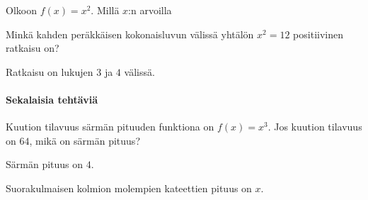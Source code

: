 \begin{tehtavasivu}
\begin{tehtava}
Olkoon $f(x)=x^2$. Millä $x$:n arvoilla
\begin{alakohdat}
\end{alakohdat}
\begin{vastaus}
\begin{alakohdat}
\end{alakohdat}
\end{vastaus}

\end{tehtava}
\begin{tehtava}
Minkä kahden peräkkäisen kokonaisluvun välissä yhtälön $x^2 = 12$ positiivinen ratkaisu on?
\begin{vastaus}
Ratkaisu on lukujen $3$ ja $4$ välissä.
\end{vastaus}
\end{tehtava}

\paragraph*{Sekalaisia tehtäviä}

\begin{tehtava}
Kuution tilavuus särmän pituuden funktiona on $f(x) = x^3$. Jos kuution tilavuus on $64$, mikä on särmän pituus?
\begin{vastaus}
Särmän pituus on $4$.
\end{vastaus}
\end{tehtava}

\begin{tehtava}
Suorakulmaisen kolmion molempien kateettien pituus on $x$.
\begin{alakohdat}
\end{alakohdat}
\begin{vastaus}
\begin{alakohdat}
\end{alakohdat}
\end{vastaus}
\end{tehtava}

\end{tehtavasivu}
